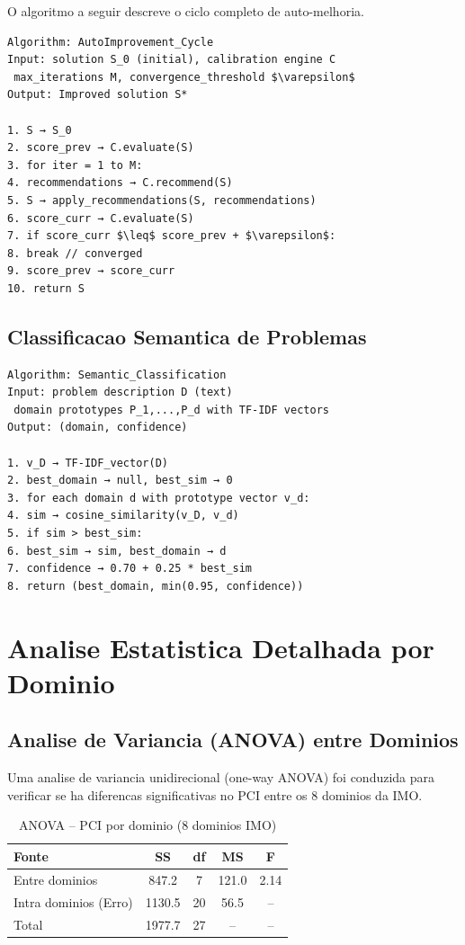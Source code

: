 \documentclass[5p]{elsarticle}
\begin{document}
O algoritmo a seguir descreve o ciclo completo de auto-melhoria.

\begin{Verbatim}[fontsize=\footnotesize,frame=single]
Algorithm: AutoImprovement_Cycle
Input: solution S_0 (initial), calibration engine C
 max_iterations M, convergence_threshold $\varepsilon$
Output: Improved solution S*

1. S → S_0
2. score_prev → C.evaluate(S)
3. for iter = 1 to M:
4. recommendations → C.recommend(S)
5. S → apply_recommendations(S, recommendations)
6. score_curr → C.evaluate(S)
7. if score_curr $\leq$ score_prev + $\varepsilon$:
8. break // converged
9. score_prev → score_curr
10. return S
\end{Verbatim}

\subsection{Classificacao Semantica de Problemas}

\begin{Verbatim}[fontsize=\footnotesize,frame=single]
Algorithm: Semantic_Classification
Input: problem description D (text)
 domain prototypes P_1,...,P_d with TF-IDF vectors
Output: (domain, confidence)

1. v_D → TF-IDF_vector(D)
2. best_domain → null, best_sim → 0
3. for each domain d with prototype vector v_d:
4. sim → cosine_similarity(v_D, v_d)
5. if sim > best_sim:
6. best_sim → sim, best_domain → d
7. confidence → 0.70 + 0.25 * best_sim
8. return (best_domain, min(0.95, confidence))
\end{Verbatim}

\section{Analise Estatistica Detalhada por Dominio}

\subsection{Analise de Variancia (ANOVA) entre Dominios}

Uma analise de variancia unidirecional (one-way ANOVA) foi conduzida para
verificar se ha diferencas significativas no PCI entre os 8 dominios da IMO.

\begin{table}[H]
 \centering
 \caption{ANOVA -- PCI por dominio (8 dominios IMO)}
 \label{tab:anova}
 \footnotesize
 \begin{tabular}{lcccc}
 \toprule
 \textbf{Fonte} & \textbf{SS} & \textbf{df} & \textbf{MS} & \textbf{F}\\
 \midrule
 Entre dominios & 847.2 & 7 & 121.0 & 2.14\\
 Intra dominios (Erro) & 1130.5 & 20 & 56.5 & --\\
 \midrule
 Total & 1977.7 & 27 & -- & --\\
 \bottomrule
 \end{tabular}
\end{table}
\end{document}
